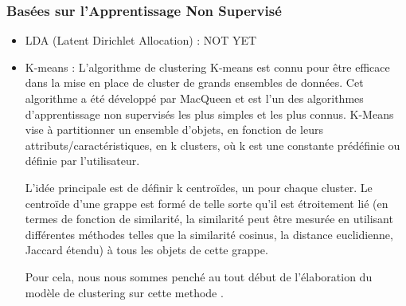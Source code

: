         \subsubsection{Basées sur l'Apprentissage Non Supervisé}
            \begin{itemize}
                \item{LDA (Latent Dirichlet Allocation) : }
                NOT YET
                \item{K-means : }
                L'algorithme de clustering K-means est connu pour être efficace dans la mise en place de cluster de grands ensembles de données. Cet algorithme a été développé par MacQueen et est l'un des algorithmes d'apprentissage non supervisés les plus simples et les plus connus. K-Means vise à partitionner un ensemble d'objets, en fonction de leurs attributs/caractéristiques, en k clusters, où k est une constante prédéfinie ou définie par l'utilisateur. 
            
                L'idée principale est de définir k centroïdes, un pour chaque cluster. Le centroïde d'une grappe est formé de telle sorte qu'il est étroitement lié (en termes de fonction de similarité, la similarité peut être mesurée en utilisant différentes méthodes telles que la similarité cosinus, la distance euclidienne, Jaccard étendu) à tous les objets de cette grappe.
            
                Pour cela, nous nous sommes penché au tout début de l'élaboration du modèle de clustering sur cette methode \cite{methodeKmeans}.
            \end{itemize}

